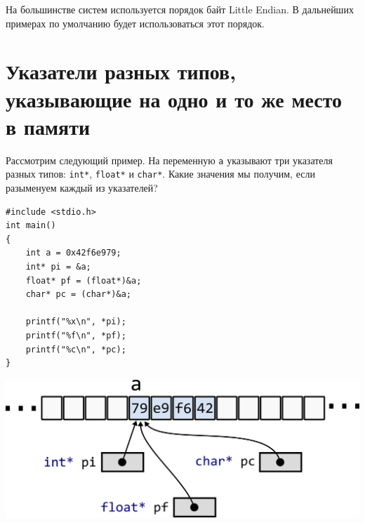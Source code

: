 \documentclass[10pt]{article}
\begin{document}
На большинстве систем используется порядок байт Little Endian. В дальнейших примерах по умолчанию будет использоваться этот порядок.




\newpage
\section*{Указатели разных типов, указывающие на одно и то же место в памяти}

Рассмотрим следующий пример. На переменную \texttt{a} указывают три указателя разных типов: \texttt{int*}, \texttt{float*} и \texttt{char*}. Какие значения мы получим, если разыменуем каждый из указателей?

\begin{minipage}{0.4\textwidth}
\begin{lstlisting}
#include <stdio.h>
int main() 
{
    int a = 0x42f6e979;
    int* pi = &a;
    float* pf = (float*)&a;
    char* pc = (char*)&a;
    
    printf("%x\n", *pi);
    printf("%f\n", *pf);
    printf("%c\n", *pc);
}
\end{lstlisting}
\end{minipage}
\begin{minipage}{0.5\textwidth}
\begin{center}
\includegraphics[scale=0.65]{../images/memory_int_char_pointer.png}
\end{center}
\end{minipage}
\end{document}
